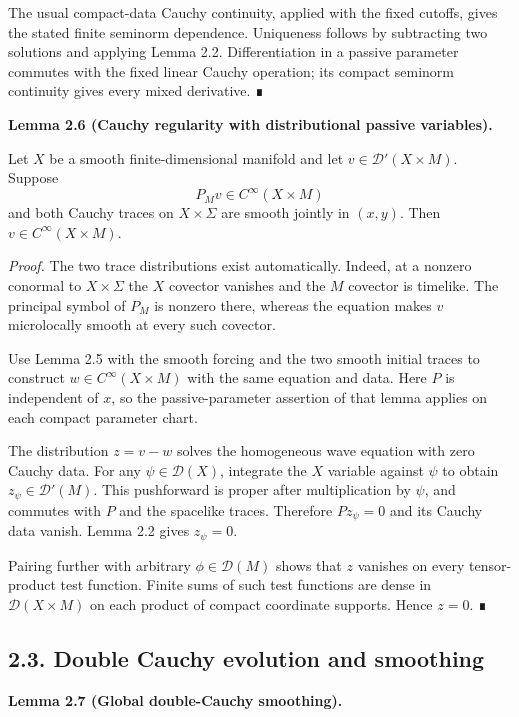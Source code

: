 \documentclass[
  english,
  11pt,
  reqno]{amsart}
\makeatletter
\newcommand{\paperdisplaynext}{%
  \let\paper@savedstartsection\@startsection
  \def\@startsection##1##2##3##4##5##6{%
    \let\@startsection\paper@savedstartsection
    \@tempskipa ##5\relax
    \ifdim\@tempskipa<\z@
      \def\paper@afterskip{.35\baselineskip}%
    \else
      \def\paper@afterskip{##5}%
    \fi
    \@startsection{##1}{##2}{##3}{##4}{\paper@afterskip}{##6}}}
\newcommand{\paperdisplaysection}{\paperdisplaynext\subsection}
\newcommand{\pandocstatementheading}[1]{%
  \par\if@nobreak\else
    \addpenalty{\@beginparpenalty}%
    \addvspace{.5\baselineskip plus .2\baselineskip minus .2\baselineskip}%
  \fi
  {\normalfont\bfseries #1\par}%
  \nobreak\@afterindenttrue\@afterheading
}
\makeatother
\begin{document}
The usual compact-data Cauchy continuity, applied with the fixed
cutoffs, gives the stated finite seminorm dependence. Uniqueness follows
by subtracting two solutions and applying Lemma 2.2. Differentiation in
a passive parameter commutes with the fixed linear Cauchy operation; its
compact seminorm continuity gives every mixed derivative. ∎

\pandocstatementheading{\protect{}\label{lem:passive-cauchy-regularity}Lemma 2.6 (Cauchy regularity with distributional passive variables).}

Let \(X\) be a smooth finite-dimensional manifold and let
\(v\in\mathcal D'(X\times M)\). Suppose \[
P_Mv\in C^\infty(X\times M)
\] and both Cauchy traces on \(X\times\Sigma\) are smooth jointly in
\((x,y)\). Then \(v\in C^\infty(X\times M)\).

\emph{Proof.} The two trace distributions exist automatically. Indeed,
at a nonzero conormal to \(X\times\Sigma\) the \(X\) covector vanishes
and the \(M\) covector is timelike. The principal symbol of \(P_M\) is
nonzero there, whereas the equation makes \(v\) microlocally smooth at
every such covector.

Use Lemma 2.5 with the smooth forcing and the two smooth initial traces
to construct \(w\in C^\infty(X\times M)\) with the same equation and
data. Here \(P\) is independent of \(x\), so the passive-parameter
assertion of that lemma applies on each compact parameter chart.

The distribution \(z=v-w\) solves the homogeneous wave equation with
zero Cauchy data. For any \(\psi\in\mathcal D(X)\), integrate the \(X\)
variable against \(\psi\) to obtain \(z_\psi\in\mathcal D'(M)\). This
pushforward is proper after multiplication by \(\psi\), and commutes
with \(P\) and the spacelike traces. Therefore \(Pz_\psi=0\) and its
Cauchy data vanish. Lemma 2.2 gives \(z_\psi=0\).

Pairing further with arbitrary \(\phi\in\mathcal D(M)\) shows that \(z\)
vanishes on every tensor-product test function. Finite sums of such test
functions are dense in \(\mathcal D(X\times M)\) on each product of
compact coordinate supports. Hence \(z=0\). ∎

\protect{}\label{sec:double-cauchy-evolution}
\paperdisplaysection{2.3. Double Cauchy evolution and
smoothing}\label{double-cauchy-evolution-and-smoothing}
\pandocstatementheading{\protect{}\label{lem:global-double-cauchy-smoothing}Lemma 2.7 (Global double-Cauchy smoothing).}
\end{document}
